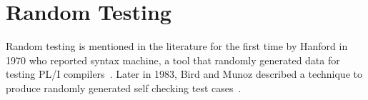 \section{Random Testing}
Random testing is mentioned in the literature for the first time by Hanford in 1970 who reported syntax machine, a tool that randomly generated data for testing PL/I compilers~\cite{hanford1970automatic}. Later in 1983, Bird and Munoz described a technique to produce randomly generated self checking test cases~\cite{bird1983automatic}. 
